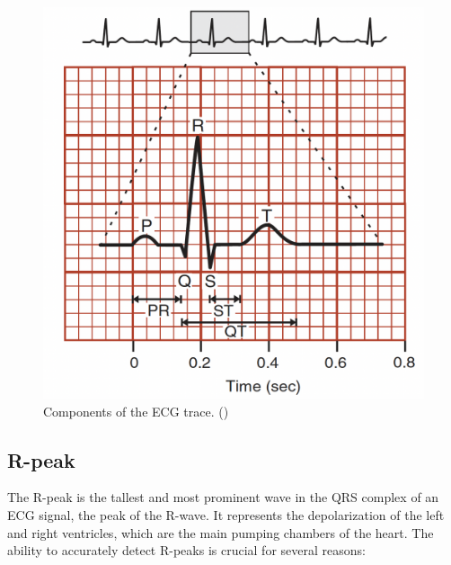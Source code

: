 \documentclass{mldsmsc}
\begin{document}
\begin{figure}[H]
\centering
\includegraphics[width=0.5\linewidth]{images/ecg.png}
\caption{Components of the ECG trace. (\cite{alma991000225790601591})}
\label{fig:ecg-huszar}
\end{figure}

\subsection{R-peak}\label{sec:rpeaks}

The R-peak is the tallest and most prominent wave in the QRS complex of an ECG signal, the peak of the R-wave. It represents the depolarization of the left and right ventricles, which are the main pumping chambers of the heart. The ability to accurately detect R-peaks is crucial for several reasons:
\end{document}
